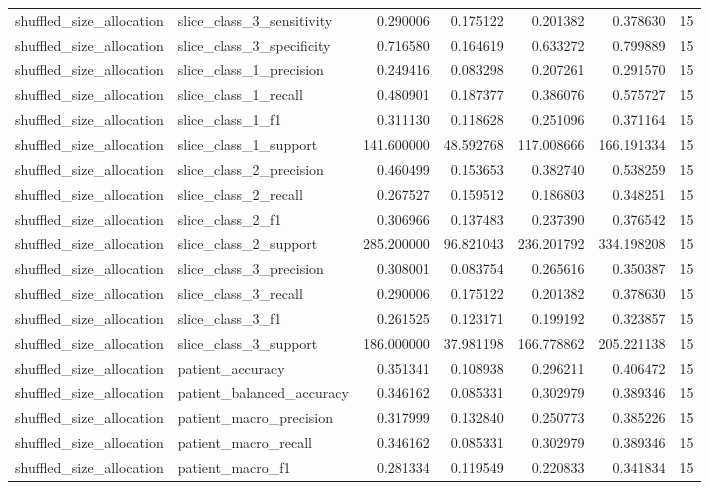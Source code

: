 \begin{tabular}{llrrrrr}
shuffled_size_allocation & slice_class_3_sensitivity & 0.290006 & 0.175122 & 0.201382 & 0.378630 & 15 \\
shuffled_size_allocation & slice_class_3_specificity & 0.716580 & 0.164619 & 0.633272 & 0.799889 & 15 \\
shuffled_size_allocation & slice_class_1_precision & 0.249416 & 0.083298 & 0.207261 & 0.291570 & 15 \\
shuffled_size_allocation & slice_class_1_recall & 0.480901 & 0.187377 & 0.386076 & 0.575727 & 15 \\
shuffled_size_allocation & slice_class_1_f1 & 0.311130 & 0.118628 & 0.251096 & 0.371164 & 15 \\
shuffled_size_allocation & slice_class_1_support & 141.600000 & 48.592768 & 117.008666 & 166.191334 & 15 \\
shuffled_size_allocation & slice_class_2_precision & 0.460499 & 0.153653 & 0.382740 & 0.538259 & 15 \\
shuffled_size_allocation & slice_class_2_recall & 0.267527 & 0.159512 & 0.186803 & 0.348251 & 15 \\
shuffled_size_allocation & slice_class_2_f1 & 0.306966 & 0.137483 & 0.237390 & 0.376542 & 15 \\
shuffled_size_allocation & slice_class_2_support & 285.200000 & 96.821043 & 236.201792 & 334.198208 & 15 \\
shuffled_size_allocation & slice_class_3_precision & 0.308001 & 0.083754 & 0.265616 & 0.350387 & 15 \\
shuffled_size_allocation & slice_class_3_recall & 0.290006 & 0.175122 & 0.201382 & 0.378630 & 15 \\
shuffled_size_allocation & slice_class_3_f1 & 0.261525 & 0.123171 & 0.199192 & 0.323857 & 15 \\
shuffled_size_allocation & slice_class_3_support & 186.000000 & 37.981198 & 166.778862 & 205.221138 & 15 \\
shuffled_size_allocation & patient_accuracy & 0.351341 & 0.108938 & 0.296211 & 0.406472 & 15 \\
shuffled_size_allocation & patient_balanced_accuracy & 0.346162 & 0.085331 & 0.302979 & 0.389346 & 15 \\
shuffled_size_allocation & patient_macro_precision & 0.317999 & 0.132840 & 0.250773 & 0.385226 & 15 \\
shuffled_size_allocation & patient_macro_recall & 0.346162 & 0.085331 & 0.302979 & 0.389346 & 15 \\
shuffled_size_allocation & patient_macro_f1 & 0.281334 & 0.119549 & 0.220833 & 0.341834 & 15 \\

\end{tabular}
